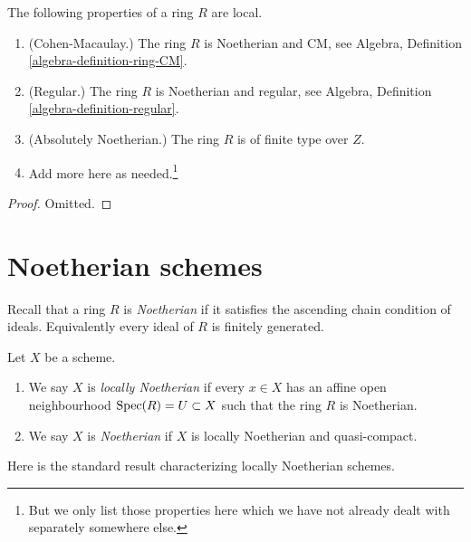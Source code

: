 \begin{lemma}
\label{lemma-properties-local}
The following properties of a ring $R$ are local.
\begin{enumerate}
\item (Cohen-Macaulay.)
The ring $R$ is Noetherian and CM, see
Algebra, Definition \ref{algebra-definition-ring-CM}.
\item (Regular.)
The ring $R$ is Noetherian and regular, see
Algebra, Definition \ref{algebra-definition-regular}.
\item (Absolutely Noetherian.)
The ring $R$ is of finite type over $Z$.
\item Add more here as needed.\footnote{But we only list those properties
here which we have not already dealt with separately somewhere else.}
\end{enumerate}
\end{lemma}

\begin{proof}
Omitted.
\end{proof}















\section{Noetherian schemes}
\label{section-noetherian}

\noindent
Recall that a ring $R$ is {\it Noetherian} if it satisfies the ascending
chain condition of ideals. Equivalently every ideal of $R$ is finitely
generated.

\begin{definition}
\label{definition-noetherian}
Let $X$ be a scheme.
\begin{enumerate}
\item We say $X$ is {\it locally Noetherian} if every
$x \in X$ has an affine open neighbourhood
$\mathop{\mathrm{Spec}}(R) = U \subset X$ such that the ring $R$ is Noetherian.
\item We say $X$ is {\it Noetherian} if $X$ is locally Noetherian
and quasi-compact.
\end{enumerate}
\end{definition}

\noindent
Here is the standard result characterizing locally Noetherian schemes.

